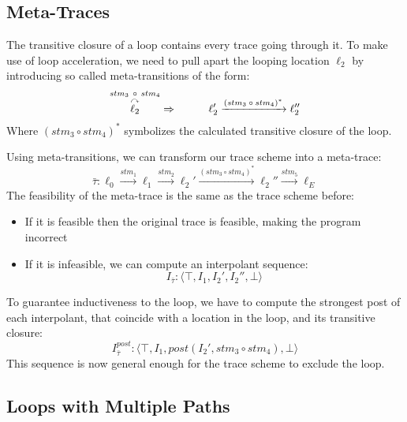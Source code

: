 \documentclass{article}
\begin{document}
\subsection{Meta-Traces}
The transitive closure of a loop contains every trace going through it. To make use of loop acceleration, we need to pull apart the looping location $\ell_2$ by introducing so called meta-transitions of the form:
\begin{equation*}
\overset{stm_3\ \circ \ stm_4}{\overset{\curvearrowright}{\ell_2}} \Rightarrow \hspace*{1cm} \ell_2' \xrightarrow{\text{$(stm_3 \circ stm_4)^*$}} \ell_2''
\end{equation*}
Where $(stm_3 \circ stm_4)^*$ symbolizes the calculated transitive closure of the loop. \par
Using meta-transitions, we can transform our trace scheme into a meta-trace:
\begin{equation*}
\bar{\tau}: \ell_0 \xrightarrow{\text{$stm_1$}} \ell_1 \xrightarrow{\text{$stm_2$}} \ell_2' \xrightarrow{\text{$(stm_3 \circ stm_4)^*$}} \ell_2'' \xrightarrow{\text{$stm_5$}} \ell_E
\end{equation*}
The feasibility of the meta-trace is the same as the trace scheme before: \\
\begin{itemize}
	\item  If it is feasible then the original trace is feasible, making the program incorrect
	\item If it is infeasible, we can compute an interpolant sequence: \\
	\begin{equation*}
	I_{\bar{\tau}}: \langle \top, I_1, I_2', I_2'', \bot  \rangle
	\end{equation*}
\end{itemize}

To guarantee inductiveness to the loop, we have to compute the strongest post of each interpolant, that coincide with a location in the loop, and its transitive closure:
\begin{equation*}
I_{\bar{\tau}}^{post}: \langle \top, I_1, post(I_2', stm_3 \circ stm_4), \bot  \rangle
\end{equation*}
This sequence is now general enough for the trace scheme to exclude the loop.

\subsection{Loops with Multiple Paths}
\end{document}
